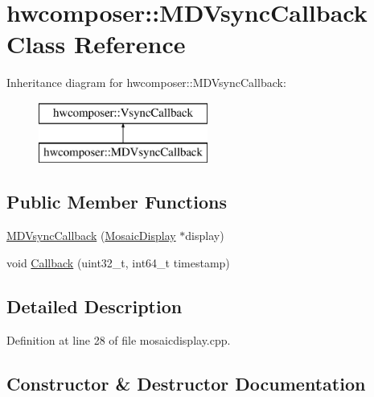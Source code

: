 \hypertarget{classhwcomposer_1_1MDVsyncCallback}{}\section{hwcomposer\+:\+:M\+D\+Vsync\+Callback Class Reference}
\label{classhwcomposer_1_1MDVsyncCallback}
Inheritance diagram for hwcomposer\+:\+:M\+D\+Vsync\+Callback\+:\begin{figure}[H]
\begin{center}
\leavevmode
\includegraphics[height=2.000000cm]{classhwcomposer_1_1MDVsyncCallback}
\end{center}
\end{figure}
\subsection*{Public Member Functions}
\begin{DoxyCompactItemize}
\item 
\mbox{\hyperlink{classhwcomposer_1_1MDVsyncCallback_ae05a59bf1001e3b9932ca903f9f6439d}{M\+D\+Vsync\+Callback}} (\mbox{\hyperlink{classhwcomposer_1_1MosaicDisplay}{Mosaic\+Display}} $\ast$display)
\item 
void \mbox{\hyperlink{classhwcomposer_1_1MDVsyncCallback_af9ca73f30e00626c613f23871359f4d8}{Callback}} (uint32\+\_\+t, int64\+\_\+t timestamp)
\end{DoxyCompactItemize}


\subsection{Detailed Description}


Definition at line 28 of file mosaicdisplay.\+cpp.



\subsection{Constructor \& Destructor Documentation}
\mbox{\label{classhwcomposer_1_1MDVsyncCallback_ae05a59bf1001e3b9932ca903f9f6439d}} 

